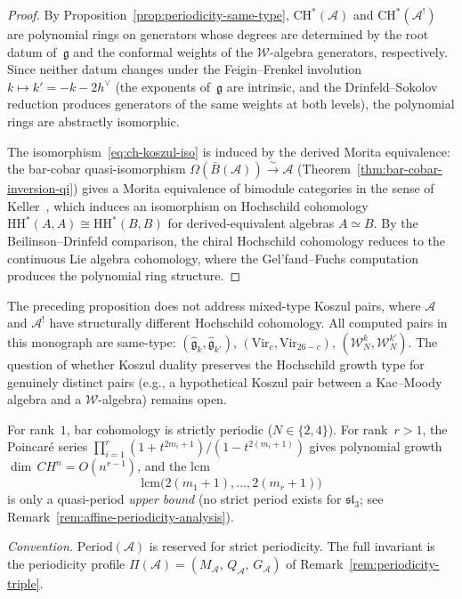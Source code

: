 \begin{proof}
By Proposition~\ref{prop:periodicity-same-type}, $\mathrm{CH}^*(\mathcal{A})$ and
$\mathrm{CH}^*(\mathcal{A}^!)$ are polynomial rings on generators whose degrees
are determined by the root datum of~$\mathfrak{g}$ and the conformal weights
of the $\mathcal{W}$-algebra generators, respectively.  Since neither datum
changes under the Feigin--Frenkel involution $k \mapsto k' = -k - 2h^\vee$
(the exponents of~$\mathfrak{g}$ are intrinsic, and the Drinfeld--Sokolov
reduction produces generators of the same weights at both levels), the
polynomial rings are abstractly isomorphic.

The isomorphism~\eqref{eq:ch-koszul-iso} is induced by the derived Morita
equivalence: the bar-cobar quasi-isomorphism
$\Omega(\bar{B}(\mathcal{A})) \xrightarrow{\sim} \mathcal{A}$
(Theorem~\ref{thm:bar-cobar-inversion-qi}) gives a Morita equivalence of
bimodule categories in the sense of Keller~\cite{Keller01}, which induces
an isomorphism on Hochschild cohomology
$\mathrm{HH}^*(A, A) \cong \mathrm{HH}^*(B, B)$ for derived-equivalent
algebras $A \simeq B$.  By the Beilinson--Drinfeld comparison, the chiral
Hochschild cohomology reduces to the continuous Lie algebra cohomology,
where the Gel'fand--Fuchs computation produces the polynomial ring
structure.
\end{proof}

\begin{remark}\label{rem:periodicity-mixed-type}
The preceding proposition does not address mixed-type Koszul pairs, where $\mathcal{A}$ and $\mathcal{A}^!$ have structurally different Hochschild cohomology.  All computed pairs in this monograph are same-type: $(\widehat{\mathfrak{g}}_k, \widehat{\mathfrak{g}}_{k'})$, $(\mathrm{Vir}_c, \mathrm{Vir}_{26-c})$, $(\mathcal{W}_N^k, \mathcal{W}_N^{k'})$.  The question of whether Koszul duality preserves the Hochschild growth type for genuinely distinct pairs (e.g., a hypothetical Koszul pair between a Kac--Moody algebra and a $\mathcal{W}$-algebra) remains open.
\end{remark}

\begin{remark}\label{rem:periodicity-profile}
For rank~$1$, bar cohomology is strictly periodic ($N \in \{2,4\}$).  For rank~$r > 1$, the Poincar\'e series $\prod_{i=1}^r (1 + t^{2m_i+1})/(1 - t^{2(m_i+1)})$ gives polynomial growth $\dim\,CH^n = O(n^{r-1})$, and the lcm
\[
\mathrm{lcm}\bigl(2(m_1{+}1), \ldots, 2(m_r{+}1)\bigr)
\]
is only a quasi-period \emph{upper bound} (no strict period exists for $\mathfrak{sl}_3$; see Remark~\ref{rem:affine-periodicity-analysis}).

\emph{Convention.}  $\mathrm{Period}(\mathcal{A})$ is reserved for strict periodicity.  The full invariant is the periodicity profile $\Pi(\mathcal{A}) = (M_{\mathcal{A}},\, Q_{\mathcal{A}},\, G_{\mathcal{A}})$ of Remark~\ref{rem:periodicity-triple}.
\end{remark}

